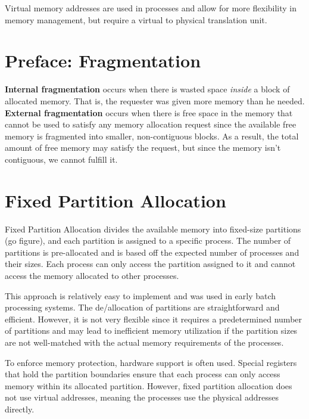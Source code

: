 \documentclass{report}
\newcommand{\definitionBegin}[1]{\begin{tcolorbox}[title={Definition: #1}]}
\newcommand{\definitionEnd}{\end{tcolorbox}}
\begin{document}
Virtual memory addresses are used in processes and allow for more flexibility in memory management,
but require a virtual to physical translation unit. 





\section*{Preface: Fragmentation}

\definitionBegin{Internal and External Fragmentation}
\textbf{Internal fragmentation} occurs when there is wasted space \textit{inside} a block of
allocated memory. That is, the requester was given more memory than he needed.
\tcblower
\textbf{External fragmentation} occurs when there is free space in the memory that cannot be used to
satisfy any memory allocation request since the available free memory is fragmented into smaller,
non-contiguous blocks. As a result, the total amount of free memory may satisfy the request, but
since the memory isn't contiguous, we cannot fulfill it.
\definitionEnd





\section{Fixed Partition Allocation}
Fixed Partition Allocation divides the available memory into fixed-size partitions (go figure), and
each partition is assigned to a specific process. The number of partitions is pre-allocated and is
based off the expected number of processes and their sizes. Each process can only access the
partition assigned to it and cannot access the memory allocated to other processes.

This approach is relatively easy to implement and was used in early batch processing systems. The
de/allocation of partitions are straightforward and efficient. However, it is not very flexible
since it requires a predetermined number of partitions and may lead to inefficient memory
utilization if the partition sizes are not well-matched with the actual memory requirements of the
processes.

To enforce memory protection, hardware support is often used. Special registers that hold the
partition boundaries ensure that each process can only access memory within its allocated
partition. However, fixed partition allocation does not use virtual addresses, meaning the processes
use the physical addresses directly.
\end{document}

